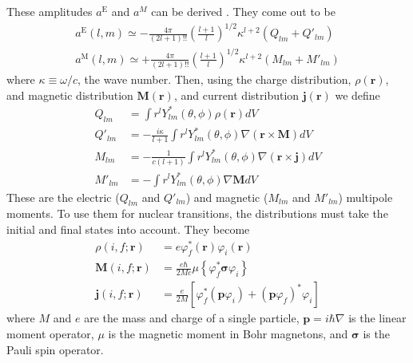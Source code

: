 These amplitudes $a^\text{E}$ and $a^{M}$ can be derived \citep{blatt79:_emradiation}. They come out to be
\begin{subequations}
\begin{align}
    a^\text{E}(l,m) \simeq - \frac{4\pi}{(2l+1)!!}\left(\frac{l+1}{l}\right)^{1/2}\kappa^{l+2}(Q_{lm}+Q'_{lm}) \\
    a^\text{M}(l,m) \simeq + \frac{4\pi}{(2l+1)!!}\left(\frac{l+1}{l}\right)^{1/2}\kappa^{l+2}(M_{lm}+M'_{lm})
\end{align}
\end{subequations}
where $\kappa\equiv\omega/c$, the wave number. Then, using the charge distribution, $\rho(\textbf{r})$, and magnetic distribution $\textbf{M}(\textbf{r})$, and current distribution $\textbf{j}(\textbf{r})$ we define
\begin{subequations}
\label{eq:multipole_moment}
\begin{align}
    Q_{lm} & = \int r^l Y_{lm}^*(\theta,\phi)\rho(\textbf{r})dV \\
    Q'_{lm} & = -\frac{i\kappa}{l+1}\int r^l Y_{lm}^*(\theta,\phi)\nabla(\textbf{r}\times\textbf{M})dV \\
    M_{lm} & = -\frac{1}{c(l+1)}\int r^l Y_{lm}^*(\theta,\phi)\nabla(\textbf{r}\times\textbf{j})dV \\
    M'_{lm} & = -\int r^l Y_{lm}^*(\theta,\phi)\nabla\textbf{M}dV
\end{align}
\end{subequations}
These are the electric ($Q_{lm}$ and $Q'_{lm}$) and magnetic ($M_{lm}$ and $M'_{lm}$) multipole moments. To use them for nuclear transitions, the distributions must take the initial and final states into account. They become
\begin{subequations}
\begin{align}
    \rho(i,f;\textbf{r}) & = e \varphi_f^*(\textbf{r})\varphi_i(\textbf{r}) \\
    \textbf{M}(i,f;\textbf{r}) & = \frac{e\hbar}{2Mc}\mu\left\{\varphi_f^*\boldsymbol{\sigma}\varphi_i\right\} \\
    \textbf{j}(i,f;\textbf{r}) & = \frac{e}{2M}\left[\varphi_f^*(\textbf{p}\varphi_i)+(\textbf{p}\varphi_f)^*\varphi_i\right]
\end{align}
\end{subequations}
where $M$ and $e$ are the mass and charge of a single particle, $\textbf{p}=i\hbar\nabla$ is the linear moment operator, $\mu$ is the magnetic moment in Bohr magnetons, and $\boldsymbol{\sigma}$ is the Pauli spin operator.

